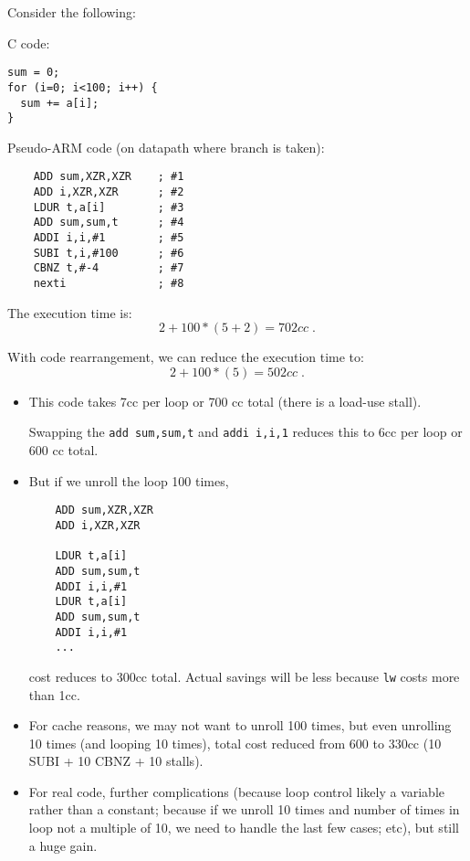 \begin{frame}[fragile]
Consider the following:
{\footnotesize
\begin{multicols}{2}
     C code:
\begin{verbatim}
sum = 0;
for (i=0; i<100; i++) {
  sum += a[i];
}
\end{verbatim}

\columnbreak
Pseudo-ARM code (on datapath where branch is taken):
\begin{verbatim}
    ADD sum,XZR,XZR    ; #1
    ADD i,XZR,XZR      ; #2
    LDUR t,a[i]        ; #3
    ADD sum,sum,t      ; #4
    ADDI i,i,#1        ; #5
    SUBI t,i,#100      ; #6
    CBNZ t,#-4         ; #7
    nexti              ; #8
\end{verbatim}
\end{multicols}
}
The execution time is:
$$2 + 100 * ( 5 + 2 ) = 702 cc\;.$$

With code rearrangement, we can reduce the execution time to:
$$2 + 100 * (5) = 502 cc\;.$$
\BNotes\ifnum{}
\begin{itemize}
\item This code takes 7cc per loop or 700 cc total (there is a load-use stall).

	Swapping the \texttt{add sum,sum,t} and \texttt{addi i,i,1}
	reduces this to 6cc per loop or 600 cc total.
\item But if we unroll the loop 100 times,
\begin{verbatim}
    ADD sum,XZR,XZR
    ADD i,XZR,XZR

    LDUR t,a[i]
    ADD sum,sum,t
    ADDI i,i,#1
    LDUR t,a[i]
    ADD sum,sum,t
    ADDI i,i,#1
    ...
\end{verbatim}
cost reduces to 300cc total.  Actual savings will be less because \texttt{lw}
costs more than 1cc.
\item For cache reasons, we may not want to unroll 100 times, but even
	unrolling 10 times (and looping 10 times), total cost reduced from
	600 to 330cc (10 SUBI + 10 CBNZ + 10 stalls).
\item For real code, further complications (because loop control likely a
	variable rather than a constant; because if we unroll 10 times and
	number of times in loop not a multiple of 10, we need to handle
	the last few cases; etc), but still a huge gain.
\end{itemize}
\fi\ENotes
\end{frame}

